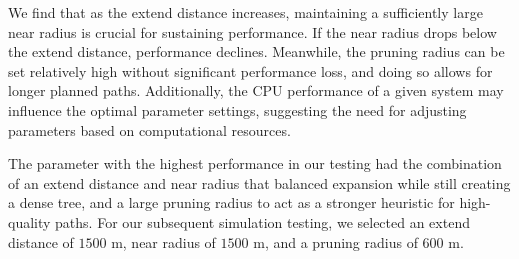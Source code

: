
We find that as the extend distance increases, maintaining a sufficiently large near radius is crucial for sustaining performance. If the near radius drops below the extend distance, performance declines. Meanwhile, the pruning radius can be set relatively high without significant performance loss, and doing so allows for longer planned paths. Additionally, the CPU performance of a given system may influence the optimal parameter settings, suggesting the need for adjusting parameters based on computational resources.


The parameter with the highest performance in our testing had the combination of an extend distance and near radius that balanced expansion while still creating a dense tree, and a large pruning radius to act as a stronger heuristic for high-quality paths. For our subsequent simulation testing, we selected an extend distance of $1500$ m, near radius of $1500$ m, and a pruning radius of $600$ m. 




